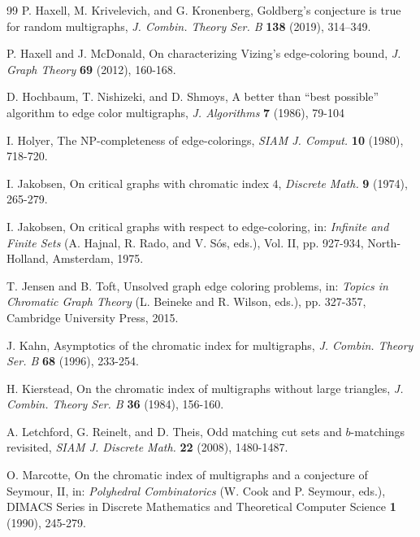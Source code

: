 \documentclass[11pt]{article}
\begin{document}
\begin{thebibliography}{99}
\vspace{-2mm}
 P. Haxell, M. Krivelevich, and G. Kronenberg, Goldberg's conjecture is true for random
multigraphs, {\em J. Combin. Theory Ser. B} {\bf 138} (2019), 314–349.

\vspace{-2mm}
 P. Haxell and J. McDonald, On characterizing Vizing's edge-coloring bound, {\em J. Graph
Theory} {\bf 69} (2012), 160-168. 

\vspace{-2mm}
 D. Hochbaum, T. Nishizeki, and D. Shmoys, A better than ``best possible'' algorithm to 
edge color multigraphs, {\it J. Algorithms} {\bf 7} (1986), 79-104

\vspace{-2mm}
 I. Holyer, The NP-completeness of edge-colorings, {\em SIAM J. Comput.}
{\bf 10} (1980), 718-720.

\vspace{-2mm}
 I. Jakobsen, On critical graphs with chromatic index $4$, {\em Discrete Math.} {\bf 9}
(1974), 265-279.

\vspace{-2mm}
 I. Jakobsen, On critical graphs with respect to edge-coloring, in: {\em Infinite and Finite
Sets} (A. Hajnal, R. Rado, and V. S\'os, eds.), Vol. II, pp. 927-934, North-Holland, Amsterdam, 1975.  

\vspace{-2mm}
 T. Jensen and B. Toft, Unsolved graph edge coloring problems, in: {\em Topics in Chromatic 
Graph Theory} (L. Beineke and R. Wilson, eds.), pp. 327-357, Cambridge University Press, 2015.

\vspace{-2mm}
 J. Kahn, Asymptotics of the chromatic index for multigraphs,
{\em J. Combin. Theory Ser. B} {\bf 68} (1996), 233-254.

\vspace{-2mm}
 H. Kierstead, On the chromatic index of multigraphs without large triangles,
{\em J. Combin. Theory Ser. B} {\bf 36} (1984), 156-160.

\vspace{-2mm}
 A. Letchford, G. Reinelt, and D. Theis, Odd matching cut sets and $b$-matchings
revisited, {\em SIAM J. Discrete Math.} {\bf 22} (2008), 1480-1487.

\vspace{-2mm}
 O. Marcotte, On the chromatic index of multigraphs and a conjecture of Seymour,
II, in: {\em Polyhedral Combinatorics} (W. Cook and P. Seymour, eds.), DIMACS Series in 
Discrete Mathematics and Theoretical Computer Science {\bf 1} (1990), 245-279.  


\end{thebibliography}
\end{document}
